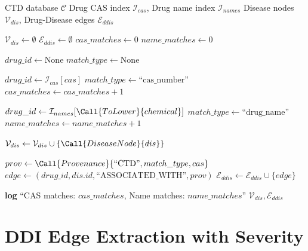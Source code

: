 \documentclass[11pt,a4paper]{article}
\begin{document}
\begin{algorithm}[H]
\caption{IntegrateCTD: Drug-Disease Associations}
\label{alg:ctd}
\begin{algorithmic}[1]
\REQUIRE CTD database $\mathcal{C}$
\REQUIRE Drug CAS index $\mathcal{I}_{cas}$, Drug name index $\mathcal{I}_{names}$
\ENSURE Disease nodes $\mathcal{V}_{dis}$, Drug-Disease edges $\mathcal{E}_{ddis}$

\STATE $\mathcal{V}_{dis} \gets \emptyset$
\STATE $\mathcal{E}_{ddis} \gets \emptyset$
\STATE $cas\_matches \gets 0$
\STATE $name\_matches \gets 0$

    \STATE $drug\_id \gets \text{None}$
    \STATE $match\_type \gets \text{None}$
    
    \STATE {}
        \STATE $drug\_id \gets \mathcal{I}_{cas}[cas]$
        \STATE $match\_type \gets \text{``cas\_number''}$
        \STATE $cas\_matches \gets cas\_matches + 1$
    
    \STATE {}
        \STATE $drug\_id \gets \mathcal{I}_{names}[\Call{ToLower}{chemical}]$
        \STATE $match\_type \gets \text{``drug\_name''}$
        \STATE $name\_matches \gets name\_matches + 1$
    \ENDIF
    
                \STATE $\mathcal{V}_{dis} \gets \mathcal{V}_{dis} \cup \{\Call{DiseaseNode}{dis}\}$
            \ENDIF
            
            \STATE $prov \gets \Call{Provenance}{\text{``CTD''}, match\_type, cas}$
            \STATE $edge \gets (drug\_id, dis.id, \text{``ASSOCIATED\_WITH''}, prov)$
            \STATE $\mathcal{E}_{ddis} \gets \mathcal{E}_{ddis} \cup \{edge\}$
        \ENDFOR
    \ENDIF
\ENDFOR

\STATE \textbf{log} ``CAS matches: $cas\_matches$, Name matches: $name\_matches$''
\RETURN $\mathcal{V}_{dis}, \mathcal{E}_{ddis}$
\end{algorithmic}
\end{algorithm}

\newpage
\section{DDI Edge Extraction with Severity}
\end{document}
